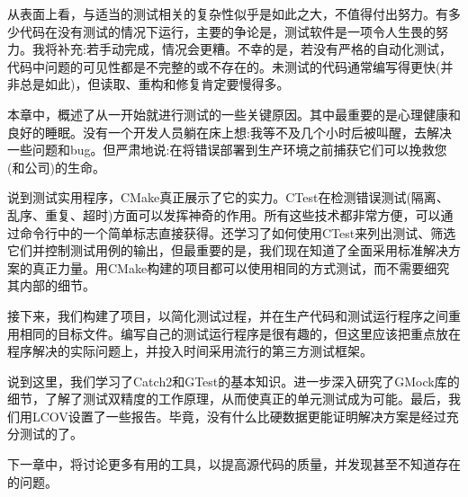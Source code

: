 

从表面上看，与适当的测试相关的复杂性似乎是如此之大，不值得付出努力。有多少代码在没有测试的情况下运行，主要的争论是，测试软件是一项令人生畏的努力。我将补充:若手动完成，情况会更糟。不幸的是，若没有严格的自动化测试，代码中问题的可见性都是不完整的或不存在的。未测试的代码通常编写得更快(并非总是如此)，但读取、重构和修复肯定要慢得多。

本章中，概述了从一开始就进行测试的一些关键原因。其中最重要的是心理健康和良好的睡眠。没有一个开发人员躺在床上想:我等不及几个小时后被叫醒，去解决一些问题和bug。但严肃地说:在将错误部署到生产环境之前捕获它们可以挽救您(和公司)的生命。

说到测试实用程序，CMake真正展示了它的实力。CTest在检测错误测试(隔离、乱序、重复、超时)方面可以发挥神奇的作用。所有这些技术都非常方便，可以通过命令行中的一个简单标志直接获得。还学习了如何使用CTest来列出测试、筛选它们并控制测试用例的输出，但最重要的是，我们现在知道了全面采用标准解决方案的真正力量。用CMake构建的项目都可以使用相同的方式测试，而不需要细究其内部的细节。

接下来，我们构建了项目，以简化测试过程，并在生产代码和测试运行程序之间重用相同的目标文件。编写自己的测试运行程序是很有趣的，但这里应该把重点放在程序解决的实际问题上，并投入时间采用流行的第三方测试框架。

说到这里，我们学习了Catch2和GTest的基本知识。进一步深入研究了GMock库的细节，了解了测试双精度的工作原理，从而使真正的单元测试成为可能。最后，我们用LCOV设置了一些报告。毕竟，没有什么比硬数据更能证明解决方案是经过充分测试的了。

下一章中，将讨论更多有用的工具，以提高源代码的质量，并发现甚至不知道存在的问题。








